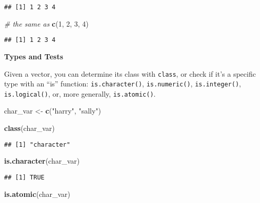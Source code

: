 \documentclass[
]{book}
\newenvironment{Shaded}{\begin{snugshade}}{\end{snugshade}}
\newcommand{\CommentTok}[1]{\textcolor[rgb]{0.56,0.35,0.01}{\textit{#1}}}
\newcommand{\DecValTok}[1]{\textcolor[rgb]{0.00,0.00,0.81}{#1}}
\newcommand{\KeywordTok}[1]{\textcolor[rgb]{0.13,0.29,0.53}{\textbf{#1}}}
\newcommand{\NormalTok}[1]{#1}
\newcommand{\StringTok}[1]{\textcolor[rgb]{0.31,0.60,0.02}{#1}}
\begin{document}
\begin{verbatim}
## [1] 1 2 3 4
\end{verbatim}

\begin{Shaded}
\begin{Highlighting}[]
\CommentTok{\# the same as}
\KeywordTok{c}\NormalTok{(}\DecValTok{1}\NormalTok{, }\DecValTok{2}\NormalTok{, }\DecValTok{3}\NormalTok{, }\DecValTok{4}\NormalTok{)}
\end{Highlighting}
\end{Shaded}

\begin{verbatim}
## [1] 1 2 3 4
\end{verbatim}

\textbf{Types and Tests}

Given a vector, you can determine its class with \texttt{class}, or check if it's a specific type with an ``is'' function: \texttt{is.character()}, \texttt{is.numeric()}, \texttt{is.integer()}, \texttt{is.logical()}, or, more generally, \texttt{is.atomic()}.

\begin{Shaded}
\begin{Highlighting}[]
\NormalTok{char\_var \textless{}{-}}\StringTok{ }\KeywordTok{c}\NormalTok{(}\StringTok{"harry"}\NormalTok{, }\StringTok{"sally"}\NormalTok{)}

\KeywordTok{class}\NormalTok{(char\_var)}
\end{Highlighting}
\end{Shaded}

\begin{verbatim}
## [1] "character"
\end{verbatim}

\begin{Shaded}
\begin{Highlighting}[]
\KeywordTok{is.character}\NormalTok{(char\_var)}
\end{Highlighting}
\end{Shaded}

\begin{verbatim}
## [1] TRUE
\end{verbatim}

\begin{Shaded}
\begin{Highlighting}[]
\KeywordTok{is.atomic}\NormalTok{(char\_var)}
\end{Highlighting}
\end{Shaded}
\end{document}
